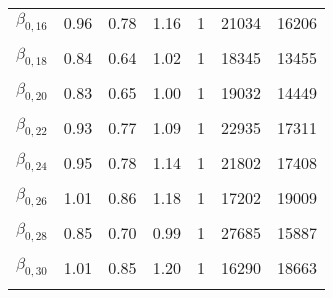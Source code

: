 \begin{longtable}[t]{lrrrrrr}
$\beta_{0, 16}$ & 0.96 & 0.78 & 1.16 & 1 & 21034 & 16206\\
\cellcolor{gray!6}{$\beta_{0, 17}$} & \cellcolor{gray!6}{0.89} & \cellcolor{gray!6}{0.73} & \cellcolor{gray!6}{1.06} & \cellcolor{gray!6}{1} & \cellcolor{gray!6}{22181} & \cellcolor{gray!6}{15773}\\
$\beta_{0, 18}$ & 0.84 & 0.64 & 1.02 & 1 & 18345 & 13455\\
\cellcolor{gray!6}{$\beta_{0, 19}$} & \cellcolor{gray!6}{0.88} & \cellcolor{gray!6}{0.74} & \cellcolor{gray!6}{1.02} & \cellcolor{gray!6}{1} & \cellcolor{gray!6}{21452} & \cellcolor{gray!6}{17338}\\
$\beta_{0, 20}$ & 0.83 & 0.65 & 1.00 & 1 & 19032 & 14449\\
\cellcolor{gray!6}{$\beta_{0, 21}$} & \cellcolor{gray!6}{0.91} & \cellcolor{gray!6}{0.76} & \cellcolor{gray!6}{1.07} & \cellcolor{gray!6}{1} & \cellcolor{gray!6}{22343} & \cellcolor{gray!6}{16544}\\
$\beta_{0, 22}$ & 0.93 & 0.77 & 1.09 & 1 & 22935 & 17311\\
\cellcolor{gray!6}{$\beta_{0, 23}$} & \cellcolor{gray!6}{0.85} & \cellcolor{gray!6}{0.69} & \cellcolor{gray!6}{1.01} & \cellcolor{gray!6}{1} & \cellcolor{gray!6}{23467} & \cellcolor{gray!6}{15972}\\
$\beta_{0, 24}$ & 0.95 & 0.78 & 1.14 & 1 & 21802 & 17408\\
\cellcolor{gray!6}{$\beta_{0, 25}$} & \cellcolor{gray!6}{0.81} & \cellcolor{gray!6}{0.68} & \cellcolor{gray!6}{0.93} & \cellcolor{gray!6}{1} & \cellcolor{gray!6}{20839} & \cellcolor{gray!6}{16243}\\
$\beta_{0, 26}$ & 1.01 & 0.86 & 1.18 & 1 & 17202 & 19009\\
\cellcolor{gray!6}{$\beta_{0, 27}$} & \cellcolor{gray!6}{0.93} & \cellcolor{gray!6}{0.80} & \cellcolor{gray!6}{1.07} & \cellcolor{gray!6}{1} & \cellcolor{gray!6}{22145} & \cellcolor{gray!6}{17652}\\
$\beta_{0, 28}$ & 0.85 & 0.70 & 0.99 & 1 & 27685 & 15887\\
\cellcolor{gray!6}{$\beta_{0, 29}$} & \cellcolor{gray!6}{0.85} & \cellcolor{gray!6}{0.70} & \cellcolor{gray!6}{0.99} & \cellcolor{gray!6}{1} & \cellcolor{gray!6}{21302} & \cellcolor{gray!6}{15385}\\
$\beta_{0, 30}$ & 1.01 & 0.85 & 1.20 & 1 & 16290 & 18663\\
\cellcolor{gray!6}{$\beta_{0, 31}$} & \cellcolor{gray!6}{0.82} & \cellcolor{gray!6}{0.61} & \cellcolor{gray!6}{1.00} & \cellcolor{gray!6}{1} & \cellcolor{gray!6}{17815} & \cellcolor{gray!6}{14700}\\

\end{longtable}
